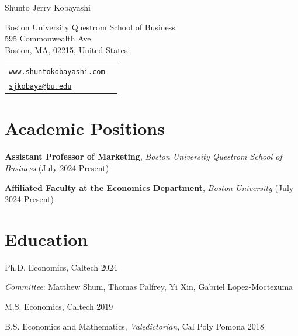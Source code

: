 \documentclass[letterpaper]{article}
\def\name{Shunto Jerry Kobayashi}
\renewenvironment{itemize}{
  \begin{list}{}{
    \setlength{\leftmargin}{1.5em}
  }
}{
  \end{list}
}
\begin{document}
{\huge \name}


\vspace{0.25in}

\begin{minipage}{0.45\linewidth}
  Boston University Questrom School of Business\\
  595 Commonwealth Ave \\
  Boston, MA, 02215, United States
\end{minipage}
\begin{minipage}{0.45\linewidth}
  \begin{tabular}{ll}
    {\tt www.shuntokobayashi.com} \\
    \href{mailto:sjkobaya@bu.edu}{\tt sjkobaya@bu.edu} \\
  \end{tabular}
\end{minipage}

\section*{Academic Positions}

\begin{itemize}
  \item \textbf{Assistant Professor of Marketing}, \textit{Boston University Questrom School of Business} \hfill (July 2024-Present)
  \item \textbf{Affiliated Faculty at the Economics Department}, \textit{Boston University} \hfill (July 2024-Present)
\end{itemize}

\section*{Education}

\begin{itemize}
  \item Ph.D. Economics, Caltech \hfill 2024
    \begin{itemize}
    \item \textit{Committee}: Matthew Shum, Thomas Palfrey, Yi Xin, Gabriel Lopez-Moctezuma
    \end{itemize}
  \item M.S. Economics, Caltech \hfill 2019
  \item B.S. Economics and Mathematics, \textit{Valedictorian},
    Cal Poly Pomona \hfill 2018
\end{itemize}
\end{document}

